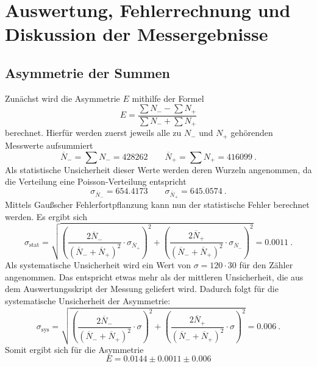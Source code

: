 \chapter{Auswertung, Fehlerrechnung und Diskussion der Messergebnisse}
\section{Asymmetrie der Summen}
Zunächst wird die Asymmetrie $E$ mithilfe der Formel 
$$ E = \frac{\sum N_- - \sum N_+}{\sum N_- + \sum N_+}
$$ berechnet. Hierfür werden zuerst jeweils alle zu $N_{-}$ und $N_{+}$ gehörenden Messwerte aufsummiert
 \begin{equation*}
     \overline{N}_{-} = \sum N_{-} = 428262 \qquad \overline{N}_{+} = \sum N_{+} = 416099 ~.
 \end{equation*}
 Als statistische Unsicherheit dieser Werte werden deren Wurzeln angenommen, da die Verteilung eine Poisson-Verteilung entspricht
  \begin{equation*}
     \sigma_{\overline{N}_{-}} = 654.4173 \qquad \sigma_{\overline{N}_{+}} = 645.0574 ~.
 \end{equation*}
 Mittels Gaußscher Fehlerfortpflanzung kann nun der statistische Fehler berechnet werden. Es ergibt sich
 \begin{equation*}
     \sigma_\text{stat} = \sqrt{\left(\frac{2\overline{N}_{-}}{(\overline{N}_{-}+\overline{N}_{+})^{2}} \cdot \sigma_{\overline{N}_{+}}\right)^{2} + \left(\frac{2\overline{N}_{+}}{(\overline{N}_{-}+\overline{N}_{+})^{2}} \cdot \sigma_{\overline{N}_{-}}\right)^{2}} = 0.0011 ~.
 \end{equation*}
Als systematische Unsicherheit wird ein Wert von $\sigma=120 \cdot 30$ für den Zähler angenommen. Das entspricht etwas mehr als der mittleren Unsicherheit, die aus dem Auswertungsskript der Messung geliefert wird.  Dadurch folgt für die systematische Unsicherheit der Asymmetrie: 
 \begin{equation*}
     \sigma_\text{sys} = \sqrt{\left(\frac{2\overline{N}_{-}}{(\overline{N}_{-}+\overline{N}_{+})^{2}} \cdot \sigma \right)^{2} + \left(\frac{2\overline{N}_{+}}{(\overline{N}_{-}+\overline{N}_{+})^{2}} \cdot \sigma \right)^{2}} = 0.006 ~.
 \end{equation*}
Somit ergibt sich für die Asymmetrie $$E=0.0144 \pm 0.0011 \pm 0.006$$
    

